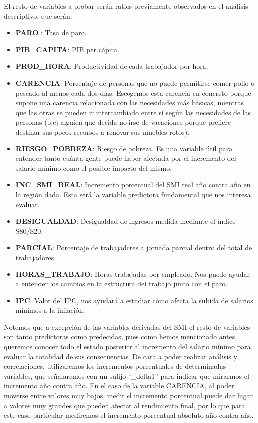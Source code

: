 \documentclass[11pt]{article}
\begin{document}
El resto de variables a probar serán ratios previamente observados en el
análisis descriptivo, que serán:

\begin{itemize}
\item
  \textbf{PARO} : Tasa de paro.
\item
  \textbf{PIB\_CAPITA}: PIB per cápita.
\item
  \textbf{PROD\_HORA}: Productividad de cada trabajador por hora.
\item
  \textbf{CARENCIA}: Porcentaje de personas que no puede permitirse
  comer pollo o pescado al menos cada dos días. Escogemos esta carencia
  en concreto porque supone una carencia relacionada con las necesidades
  más básicas, mientras que las otras se pueden ir intercambiado entre
  sí según las necesidades de las personas (p.ej alguien que decida no
  irse de vacaciones porque prefiere destinar sus pocos recursos a
  renovar sus muebles rotos).
\item
  \textbf{RIESGO\_POBREZA}: Riesgo de pobreza. Es una variable útil para
  entender tanto cuánta gente puede haber afectada por el incremento del
  salario mínimo como el posible impacto del mismo.
\item
  \textbf{INC\_SMI\_REAL}: Incremento porcentual del SMI real año contra
  año en la región dada. Esta será la variable predictora fundamental
  que nos interesa evaluar.
\item
  \textbf{DESIGUALDAD}: Desigualdad de ingresos medida mediante el
  índice S80/S20.
\item
  \textbf{PARCIAL}: Porcentaje de trabajadores a jornada parcial dentro
  del total de trabajadores.
\item
  \textbf{HORAS\_TRABAJO}: Horas trabajadas por empleado. Nos puede
  ayudar a entender los cambios en la estructura del trabajo junto con
  el paro.
\item
  \textbf{IPC}: Valor del IPC, nos ayudará a estudiar cómo afecta la
  subida de salarios mínimos a la inflación.
\end{itemize}

Notemos que a excepción de las variables derivadas del SMI el resto de
variables son tanto predictoras como predecidas, pues como hemos
mencionado antes, queremos conocer todo el estado posterior al
incremento del salario mínimo para evaluar la totalidad de sus
consecuencias. De cara a poder realizar análisis y correlaciones,
utilizaremos los incrementos porcentuales de determinadas variables, que
señalaremos con un sufijo ``\_delta1'' para indicar que mirarmos el
incremento año contra año. En el caso de la variable CARENCIA, al poder
moverse entre valores muy bajos, medir el incremento porcentual puede
dar lugar a valores muy grandes que pueden afectar al rendimiento final,
por lo que para este caso particular mediremos el incremento porcentual
absoluto año contra año.
\end{document}
